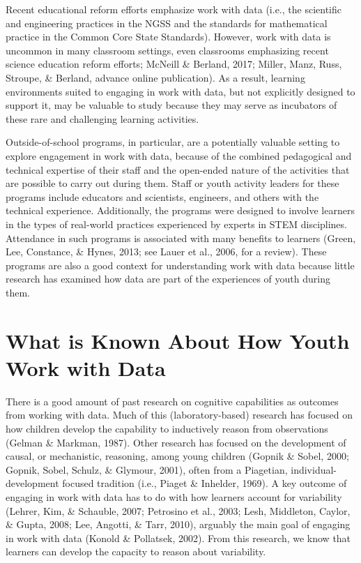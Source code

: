 \documentclass[]{book}
\theoremstyle{definition}
\theoremstyle{definition}
\theoremstyle{definition}
\theoremstyle{remark}
\begin{document}
Recent educational reform efforts emphasize work with data (i.e., the
scientific and engineering practices in the NGSS and the standards for
mathematical practice in the Common Core State Standards). However, work
with data is uncommon in many classroom settings, even classrooms
emphasizing recent science education reform efforts; McNeill \& Berland,
2017; Miller, Manz, Russ, Stroupe, \& Berland, advance online
publication). As a result, learning environments suited to engaging in
work with data, but not explicitly designed to support it, may be
valuable to study because they may serve as incubators of these rare and
challenging learning activities.

Outside-of-school programs, in particular, are a potentially valuable
setting to explore engagement in work with data, because of the combined
pedagogical and technical expertise of their staff and the open-ended
nature of the activities that are possible to carry out during them.
Staff or youth activity leaders for these programs include educators and
scientists, engineers, and others with the technical experience.
Additionally, the programs were designed to involve learners in the
types of real-world practices experienced by experts in STEM
disciplines. Attendance in such programs is associated with many
benefits to learners (Green, Lee, Constance, \& Hynes, 2013; see Lauer
et al., 2006, for a review). These programs are also a good context for
understanding work with data because little research has examined how
data are part of the experiences of youth during them.

\section{What is Known About How Youth Work with
Data}\label{what-is-known-about-how-youth-work-with-data}

There is a good amount of past research on cognitive capabilities as
outcomes from working with data. Much of this (laboratory-based)
research has focused on how children develop the capability to
inductively reason from observations (Gelman \& Markman, 1987). Other
research has focused on the development of causal, or mechanistic,
reasoning, among young children (Gopnik \& Sobel, 2000; Gopnik, Sobel,
Schulz, \& Glymour, 2001), often from a Piagetian,
individual-development focused tradition (i.e., Piaget \& Inhelder,
1969). A key outcome of engaging in work with data has to do with how
learners account for variability (Lehrer, Kim, \& Schauble, 2007;
Petrosino et al., 2003; Lesh, Middleton, Caylor, \& Gupta, 2008; Lee,
Angotti, \& Tarr, 2010), arguably the main goal of engaging in work with
data (Konold \& Pollatsek, 2002). From this research, we know that
learners can develop the capacity to reason about variability.
\end{document}
